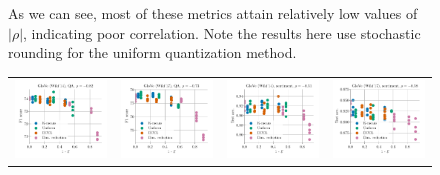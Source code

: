 \begin{figure}
{		As we can see, most of these metrics attain relatively low values of $|\rho|$, indicating poor correlation. Note the results here use stochastic rounding for the uniform quantization method.}
	\label{fig:bad_correlation_stoc}
\end{figure}

\begin{figure}
	\footnotesize
	\begin{tabular}{@{\hskip -0.0in}c@{\hskip -0.0in}c@{\hskip -0.0in}c@{\hskip -0.0in}c@{\hskip -0.0in}}
		\includegraphics[width=.245\linewidth]{figures/glove400k_qa_best-f1_vs_subspace-dist-normalized_linx_stoc.pdf} &
		\includegraphics[width=.245\linewidth]{figures/glove-wiki400k-am_qa_best-f1_vs_subspace-dist-normalized_linx_stoc.pdf} &
		\includegraphics[width=.245\linewidth]{figures/glove400k_sentiment_trec_test-acc_vs_subspace-dist-normalized_linx_stoc.pdf} &
		\includegraphics[width=.245\linewidth]{figures/glove-wiki400k-am_sentiment_trec_test-acc_vs_subspace-dist-normalized_linx_stoc.pdf}	\\

\end{tabular}
\end{figure}

